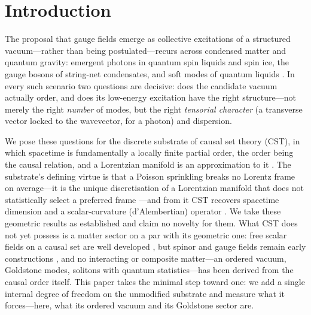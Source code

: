 \documentclass[aps,prd,reprint,nofootinbib,superscriptaddress,floatfix]{revtex4-2}
\begin{document}
\maketitle

\section{Introduction}\label{sec:intro}

The proposal that gauge fields emerge as collective excitations of a structured
vacuum---rather than being postulated---recurs across condensed matter and quantum
gravity: emergent photons in quantum spin liquids and spin ice, the gauge bosons of
string-net condensates, and soft modes of quantum liquids
\cite{SverdlovBombelli2009}. In every such scenario two questions are decisive: does
the candidate vacuum actually order, and does its low-energy excitation have the
right structure---not merely the right \emph{number} of modes, but the right
\emph{tensorial character} (a transverse vector locked to the wavevector, for a
photon) and dispersion.

We pose these questions for the discrete substrate of causal set theory (CST), in
which spacetime is fundamentally a locally finite partial order, the order being the
causal relation, and a Lorentzian manifold is an approximation to it
\cite{BLMS1987}. The substrate's defining virtue is that a Poisson sprinkling breaks
no Lorentz frame on average---it is the unique discretisation of a Lorentzian
manifold that does not statistically select a preferred frame
\cite{BombelliHensonSorkin2009}---and from it CST recovers spacetime dimension and a
scalar-curvature (d'Alembertian) operator
\cite{Myrheim1978,Meyer1988,BenincasaDowker2010,Surya2019}. We take these geometric
results as established and claim no novelty for them. What CST does not yet possess
is a matter sector on a par with its geometric one: free scalar fields on a causal
set are well developed \cite{Sorkin2007,Surya2019}, but spinor and gauge fields
remain early constructions \cite{SverdlovBombelli2009}, and no interacting or
composite matter---an ordered vacuum, Goldstone modes, solitons with quantum
statistics---has been derived from the causal order itself. This paper takes the
minimal step toward one: we add a single internal degree of freedom on the
unmodified substrate and measure what it forces---here, what its ordered vacuum and
its Goldstone sector are.
\end{document}
